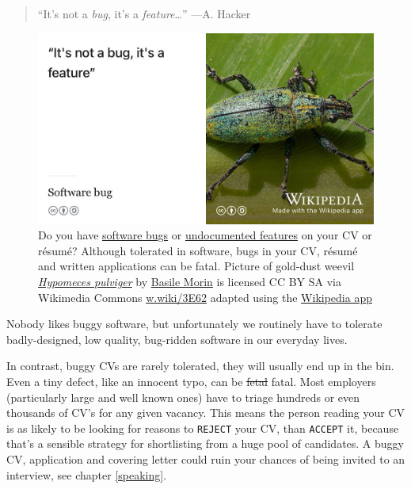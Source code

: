 \documentclass[
]{book}
\begin{document}
\begin{quote}
``It's not a \emph{bug}, it's a \emph{feature}\ldots{}'' ---A. Hacker
\end{quote}

\begin{figure}

{\centering \includegraphics[width=0.99\linewidth]{images/notabug} 

}

\caption{Do you have \href{https://en.wikipedia.org/wiki/Software_bug}{software bugs} or \href{https://en.wikipedia.org/wiki/Undocumented_feature}{undocumented features} on your CV or résumé? Although tolerated in software, bugs in your CV, résumé and written applications can be fatal. Picture of gold-dust weevil \emph{\href{https://en.wikipedia.org/wiki/Hypomeces_pulviger}{Hypomeces pulviger}} by \href{https://commons.wikimedia.org/wiki/User:Basile_Morin}{Basile Morin} is licensed CC BY SA via Wikimedia Commons \href{https://w.wiki/3E62}{w.wiki/3E62} adapted using the \href{https://apps.apple.com/us/app/wikipedia/id324715238}{Wikipedia app}}\label{fig:notabug-fig}
\end{figure}



Nobody likes buggy software, but unfortunately we routinely have to tolerate badly-designed, low quality, bug-ridden software in our everyday lives. \citep{badsoftware, failware}

In contrast, buggy CVs are rarely tolerated, they will usually end up in the bin. Even a tiny defect, like an innocent typo, can be \sout{fetal} fatal. Most employers (particularly large and well known ones) have to triage hundreds or even thousands of CV's for any given vacancy. This means the person reading your CV is as likely to be looking for reasons to \texttt{REJECT} your CV, than \texttt{ACCEPT} it, because that's a sensible strategy for shortlisting from a huge pool of candidates. A buggy CV, application and covering letter could ruin your chances of being invited to an interview, see chapter \ref{speaking}.
\end{document}
